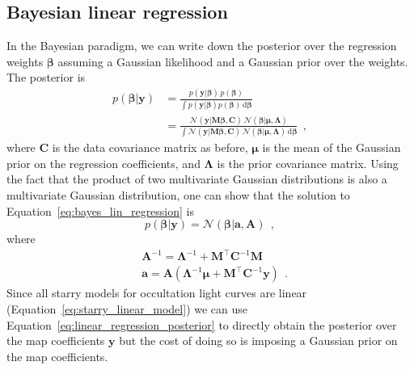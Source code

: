\documentclass[12pt,dvipsnames]{report}
\newcommand{\ud}{\,\mathrm{d}}
\newcommand{\ssf}[1]{\textsf{#1}}
\renewcommand{\vec}[1]{\boldsymbol{\mathbf{#1}}}
\newcommand{\hquad}{~~}
\begin{document}
\subsection{Bayesian linear regression}
In the Bayesian paradigm, we can write down the posterior over the regression
weights $\vec\beta$ assuming a Gaussian likelihood and a Gaussian prior over the
weights. The posterior is 
\begin{align}
    p(\vec\beta|\vec{y}) & = \frac{p(\vec{y}\lvert \vec\beta)\,p(\vec\beta)}{\int p(\vec{y}\lvert \vec\beta)p(\vec\beta) \ud\vec\beta}                                                                                                                                                 \\
                       & = \frac{    \mathcal{N}(\vec{y} \lvert\vec{M} \vec\beta, \vec{C}) \,\mathcal{N}(\vec\beta \lvert\vec{\mu}, \vec{\Lambda})}{\int \mathcal{N}(\vec{y} \lvert\vec{M} \vec\beta, \vec{C}) \,\mathcal{N}(\vec\beta \lvert\vec{\mu}, \vec{\Lambda}) \ud\vec\beta}
                       \hquad,
    \label{eq:bayes_lin_regression}
\end{align}
where $\vec{C}$ is the data covariance matrix as before, $\vec{\mu}$ is the mean
of the Gaussian prior on the regression coefficients, and $\vec{\Lambda}$ is the prior covariance matrix.
Using the fact that the product of two multivariate Gaussian distributions is also a
multivariate Gaussian distribution, one can show that
the solution to Equation~\ref{eq:bayes_lin_regression} is
\citep[see for example][]{arXiv:2005.14199}
\begin{equation}
    p(\vec\beta|\vec{y}) =\mathcal{N}(\vec\beta \lvert\vec{a}, \vec{A})
    \hquad,
    \label{eq:linear_regression_posterior}
\end{equation}
where
\begin{align}
     & \vec{A}^{-1}   =\vec{\Lambda}^{-1}+\vec{M}^{\intercal} \vec{C}^{-1} \vec{M}                                                     \\
     & \vec{a}     =\vec{A} \left(\boldsymbol{\Lambda}^{-1} \boldsymbol{\mu}+\vec{M}^{\intercal} \mathbf{C}^{-1} \boldsymbol{y}\right) 
     \hquad.
\end{align}
Since all \ssf{starry} models for occultation light curves are linear
(Equation~\ref{eq:starry_linear_model}) we can use Equation~\ref{eq:linear_regression_posterior}
to directly obtain the posterior over the map coefficients $\mathbf{y}$ but the cost
of doing so is imposing a Gaussian prior on the map coefficients.
\end{document}
